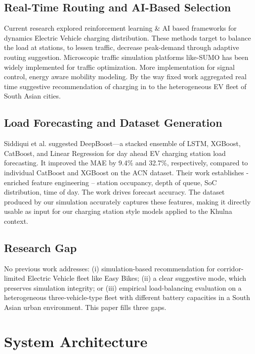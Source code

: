 \documentclass[conference]{IEEEtran}
\begin{document}
\subsection{Real-Time Routing and AI-Based Selection}

Current research explored reinforcement learning \& AI based frameworks
for dynamics Electric Vehicle charging distribution. These methods
target to balance the load at stations, to lessen traffic, decrease
peak-demand through adaptive routing suggestion. Microscopic traffic
simulation platforms like-SUMO has been widely implemented for traffic
optimization. More implementation for signal control, energy aware
mobility modeling. By the way fixed work aggregated real time suggestive
recommendation of charging in to the heterogeneous EV fleet of South
Asian cities.

\subsection{Load Forecasting and Dataset Generation}

Siddiqui et al. \cite{b8} suggested DeepBoost---a stacked ensemble of
LSTM, XGBoost, CatBoost, and Linear Regression for day ahead EV
charging station load forecasting. It improved the MAE by 9.4\% and
32.7\%, respectively, compared to individual CatBoost and XGBoost on
the ACN dataset. Their work establishes - enriched feature engineering
-- station occupancy, depth of queue, SoC distribution, time of day.
The work drives forecast accuracy. The dataset produced by our
simulation accurately captures these features, making it directly
usable as input for our charging station style models applied to the
Khulna context.

\subsection{Research Gap}

No previous work addresses: (i) simulation-based recommendation for
corridor-limited Electric Vehicle fleet like Easy Bikes; (ii) a clear
suggestive mode, which preserves simulation integrity; or (iii)
empirical load-balancing evaluation on a heterogeneous
three-vehicle-type fleet with different battery capacities in a South
Asian urban environment. This paper fills three gaps.

\section{System Architecture}
\end{document}
